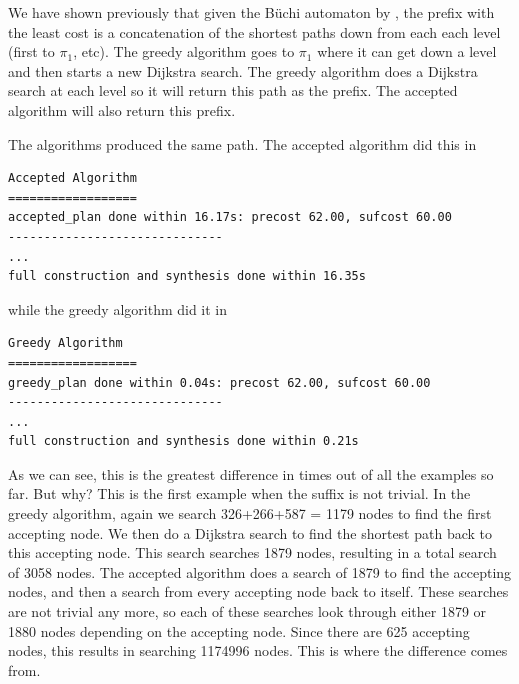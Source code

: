 We have shown previously that given the B\"{u}chi automaton by \cite{ltlbuchiwebsite}, the prefix with the least cost is a concatenation of the shortest paths down from each each level (first to $\pi_1$, etc). The greedy algorithm goes to $\pi_1$ where it can get down a level and then starts a new Dijkstra search. The greedy algorithm does a Dijkstra search at each level so it will return this path as the prefix. The accepted algorithm will also return this prefix. 

The algorithms produced the same path. The accepted algorithm did this in 
\begingroup
\fontsize{9pt}{12pt}\selectfont
\begin{lstlisting}
Accepted Algorithm
==================
accepted_plan done within 16.17s: precost 62.00, sufcost 60.00
------------------------------
...
full construction and synthesis done within 16.35s 
\end{lstlisting}
\endgroup
while the greedy algorithm did it in
\begingroup
\fontsize{9pt}{12pt}\selectfont
\begin{lstlisting}
Greedy Algorithm
==================
greedy_plan done within 0.04s: precost 62.00, sufcost 60.00
------------------------------
...
full construction and synthesis done within 0.21s 
\end{lstlisting}
\endgroup
As we can see, this is the greatest difference in times out of all the examples so far. But why? This is the first example when the suffix is not trivial. In the greedy algorithm, again we search 326+266+587 = 1179 nodes to find the first accepting node. We then do a Dijkstra search to find the shortest path back to this accepting node. This search searches 1879 nodes, resulting in a total search of 3058 nodes. The accepted algorithm does a search of 1879 to find the accepting nodes, and then a search from every accepting node back to itself. These searches are not trivial any more, so each of these searches look through either 1879 or 1880 nodes depending on the accepting node. Since there are 625 accepting nodes, this results in searching 1174996 nodes. This is where the difference comes from. 
